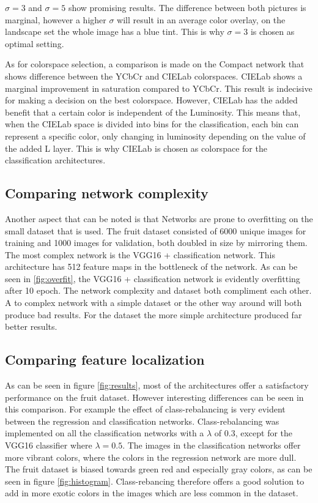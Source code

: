 $\sigma = 3$ and $\sigma = 5$ show promising results. The difference between both pictures is marginal, however a higher $\sigma$ will result in an average color overlay, on the landscape set the whole image has a blue tint. This is why $\sigma = 3$ is chosen as optimal setting.


As for colorspace selection, a comparison is made on the Compact network that shows difference between the YCbCr and CIELab colorspaces. CIELab shows a marginal improvement in saturation compared to YCbCr. This result is indecisive for making a decision on the best colorspace. However, CIELab has the added benefit that a certain color is independent of the Luminosity. This means that, when the CIELab space is divided into bins for the classification, each bin can represent a specific color, only changing in luminosity depending on the value of the added L layer. This is why CIELab is chosen as colorspace for the classification architectures.


\subsection{Comparing network complexity}

Another aspect that can be noted is that Networks are prone to overfitting on the small dataset that is used. The fruit dataset consisted of 6000 unique images for training and 1000 images for validation, both doubled in size by mirroring them. The most complex network is the VGG16 + classification network. This architecture has 512 feature maps in the bottleneck of the network. As can be seen in \ref{fig:overfit}, the VGG16 + classification network is evidently overfitting after 10 epoch. The network complexity and dataset both compliment each other. A to complex network with a simple dataset or the other way around will both produce bad results. For the dataset the more simple architecture produced far better results.

\subsection{Comparing feature localization}
As can be seen in figure \ref{fig:results}, most of the architectures offer a satisfactory performance on the fruit dataset. However interesting differences can be seen in this comparison. For example the effect of class-rebalancing is very evident between the regression and classification networks. Class-rebalancing was implemented on all the classification networks with a $\lambda$ of 0.3, except for the VGG16 classifier where $\lambda = 0.5$. The images in the classification networks offer more vibrant colors, where the colors in the regression network are more dull. The fruit dataset is biased towards green red and especially gray colors, as can be seen in figure \ref{fig:histogram}. Class-rebancing therefore offers a good solution to add in more exotic colors in the images which are less common in the dataset.

